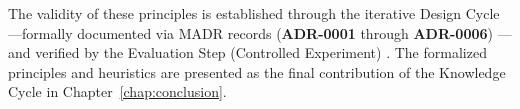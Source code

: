 





The validity of these principles is established through the iterative Design Cycle---formally documented via MADR records (\textbf{ADR-0001} through \textbf{ADR-0006}) \cite{nygard_2011, kopp_2018}---and verified by the Evaluation Step (Controlled Experiment) \cite{wohlin_2012}. The formalized principles and heuristics are presented as the final contribution of the Knowledge Cycle in Chapter~\ref{chap:conclusion}.
